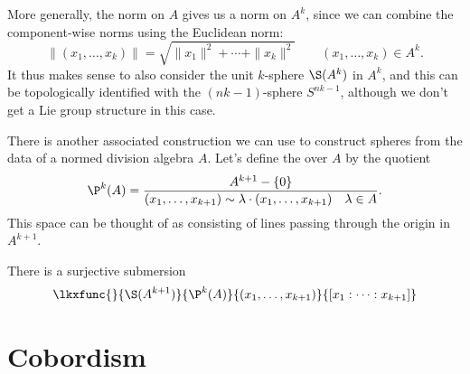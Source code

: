 More generally, the norm on $A$ gives us a norm on $A^k$, since we can combine the component-wise norms using the Euclidean norm:
\[
  \|(x_1, \ldots, x_k)\| = \sqrt{\|x_1\|^2+\cdots+\|x_k\|^2}\quad\quad (x_1,\ldots,x_k)\in A^k.
\]
It thus makes sense to also consider the unit $k$-sphere $\S(A^k)$ in $A^k$, and this can be topologically identified with the $(nk-1)$-sphere $S^{nk-1}$, although we don't get a Lie group structure in this case.

There is another associated construction we can use to construct spheres from the data of a normed division algebra $A$. Let's define the  over $A$ by the quotient
\[
  \P^k(A) = \frac{A^{k+1} -\{0\}}{(x_1,\ldots, x_{k+1})\sim \lambda \cdot (x_1,\ldots, x_{k+1})\quad \lambda\in A}.
\]
This space can be thought of as consisting of lines passing through the origin in $A^{k+1}$. 

There is a surjective submersion
\[
  \lkxfunc{}{\S(A^{k+1})}{\P^{k}(A)}{(x_1,\ldots, x_{k+1})}{[x_1 : \cdots : x_{k+1}]}
\]

\section{Cobordism}\label{sec:cobordism}
